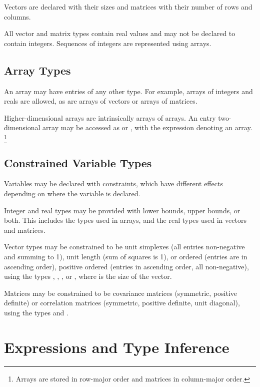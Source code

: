 \documentclass[article]{jss}
\begin{document}
Vectors are declared with their sizes and matrices with their number
of rows and columns.

All vector and matrix types contain real values and may not be
declared to contain integers.  Sequences of integers are represented
using arrays.

\subsection{Array Types}

An array may have entries of any other type.  For example, arrays of
integers and reals are allowed, as are arrays of vectors or arrays of
matrices.  

Higher-dimensional arrays are intrinsically arrays of arrays.  An
entry two-dimensional array  may be accessed as 
or , with the expression  denoting an array.%
%
\footnote{ Arrays are stored in row-major order and matrices in
  column-major order.}

\subsection{Constrained Variable Types}

Variables may be declared with constraints, which have different
effects depending on where the variable is declared.

Integer and real types may be provided with lower bounds, upper
bounds, or both.  This includes the types used in arrays, and the real
types used in vectors and matrices.

Vector types may be constrained to be unit simplexes (all entries
non-negative and summing to 1), unit length (sum of squares is 1), or
ordered (entries are in ascending order), positive ordered (entries in
ascending order, all non-negative), using the types ,
, , or
, where  is the size of the vector.

Matrices may be constrained to be covariance matrices (symmetric,
positive definite) or correlation matrices (symmetric, positive
definite, unit diagonal), using the types  and
.

\section{Expressions and Type Inference}
\end{document}
